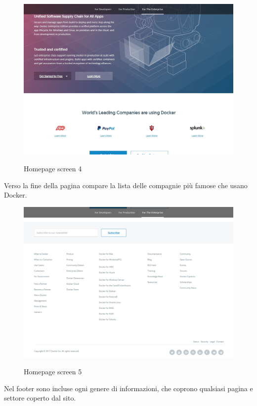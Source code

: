 \documentclass[a4paper]{article}
\begin{document}
\begin{figure}[H]
	\centering
	\includegraphics[width=\linewidth]{images/homepage4.jpg}
    \label{fig:homepage4}
    \caption{Homepage screen 4}
\end{figure}

\noindent Verso la fine della pagina compare la lista delle compagnie più famose che usano Docker.

\begin{figure}[H]
	\centering
	\includegraphics[width=\linewidth]{images/homepage5.png}
    \label{fig:homepage5}
    \caption{Homepage screen 5}
\end{figure}

\noindent Nel footer sono incluse ogni genere di informazioni, che coprono qualsiasi pagina e settore coperto dal sito.
\end{document}
